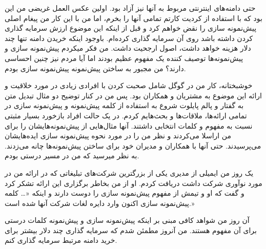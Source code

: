 حتی دامنه‌های اینترنتی مربوط به آنها نیز آزاد بود. اولین عکس العمل غریضی
من این بود که با استفاده از کردیت کارتم تمامی آنها را بخرم، اما من با
این کار من پیغام اصلی پیش‌نمونه سازی را نقض خواهم کرد و قبل از اینکه این
موضوع ارزش سرمایه گذاری کردن داشته باشد روی آن سرمایه گذاری کرده‌ام.
باوجود اینکه خریدن دامنه تنها چند دلار هزینه خواهد داشت، اصول ارجحیت
داشت. من فکر میکردم پیش‌نمونه سازی و پیش‌نمونه‌ها توصیف کننده یک مفهوم
عظیم بودند اما آیا مردم نیز چنین احساسی دارند؟ من مجبور به ساختن
پیش‌نمونه پیش‌نمونه سازی بودم.

خوشبختانه، کار من در گوگل شامل صحبت کردن با افرادی زیادی در مورد خلاقیت
و ارائه این موضوع به مشتریان و همکاران بود. پس من در کنار توضیح دو مثال
تبدیل متن به گفتار و پالم پایلوت شروع به استفاده از کلمه پیش‌نمونه و
پیش‌نمونه سازی در تمامی ارائه‌ها، ملاقات‌ها و بحث‌هایم کردم. در یک حالت
افراد بازخورد بسیار مثبتی نسبت به مفهوم و کلمات انتخابی داشتند. آنها
مثال‌هایی از پیش‌نمونه‌هایشان را برای من اراسلا می‌کردند و نظر من را در
مورد نحوه پیش‌نمونه سازی ایده‌هایشان می‌پرسیدند. حتی آنها با همکاران و
مدیران خود برای ساختن پیش‌نمونه‌ها چانه می‌زدند. به نظر میرسید که من در
مسیر درستی بودم.

یک روز من ایمیلی از مدیری یکی از بزرگترین شرکت‌های تبلیغاتی که در ارائه
من در مورد نوآوری شرکت داشت دریافت کردم. او از من بخاطر برگزاری این
ارائه تشکر کرد و گفت که او و تیمش از مفهوم پیش‌نمونه سازی را دوست دارند
و اینکه «\ldots{} کلمه پیش‌نمونه سازی اکنون وارد دایره لغات شرکت آنها
شده است.»

آن روز من شواهد کافی مبنی بر اینکه پیش‌نمونه سازی و پیش‌نمونه کلمات
درستی برای آن مفهوم هستند. من آنروز مطمئن شدم که سرمایه گذاری چند دلار
بیشتر برای خرید دامنه مرتبط سرمایه گذاری کنم.
